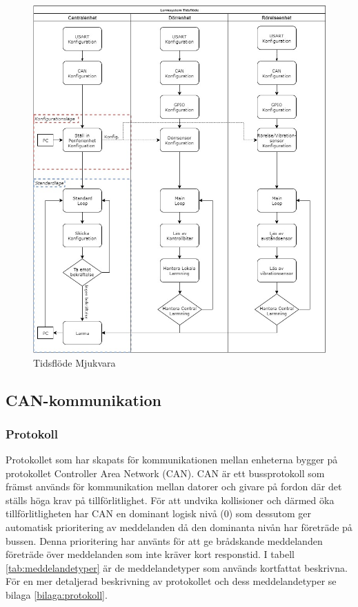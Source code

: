 \documentclass{article}
\begin{document}
\begin{figure}[H]
    \centering
    \includegraphics[width=1\textwidth]{figurer/TidsFlode.jpg}
    \caption{Tidsflöde Mjukvara}
    \label{fig:tidsflöde}
\end{figure}


\subsection{CAN-kommunikation}
\label{can}
\subsubsection{Protokoll}
Protokollet som har skapats för kommunikationen mellan enheterna bygger på protokollet Controller Area Network (CAN).
CAN är ett bussprotokoll som främst används för kommunikation mellan datorer och givare på fordon där det ställs höga krav på tillförlitlighet.
För att undvika kollisioner och därmed öka tillförlitligheten har CAN en dominant logisk nivå (0) som dessutom ger automatisk prioritering av meddelanden då den dominanta nivån har företräde på bussen.
Denna prioritering har använts för att ge brådskande meddelanden företräde över meddelanden som inte kräver kort responstid. I tabell \ref{tab:meddelandetyper} är de meddelandetyper som används kortfattat beskrivna. För en mer detaljerad beskrivning av protokollet och dess meddelandetyper se bilaga \ref{bilaga:protokoll}.
\end{document}
